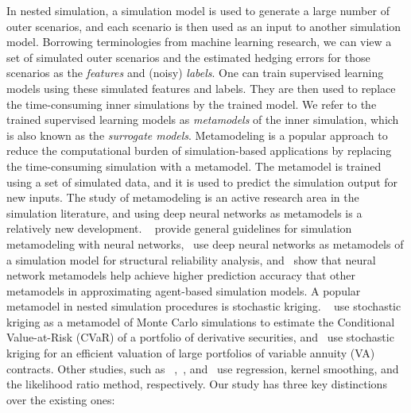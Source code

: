 \documentclass{article}
\begin{document}
In nested simulation, a simulation model is used to generate a large number of outer scenarios, and each scenario is then used as an input to another simulation model.
Borrowing terminologies from machine learning research, we can view a set of simulated outer scenarios and the estimated hedging errors for those scenarios as the \textit{features} and (noisy) \textit{labels}.
One can train supervised learning models using these simulated features and labels.
They are then used to replace the time-consuming inner simulations by the trained model.
We refer to the trained supervised learning models as \textit{metamodels} of the inner simulation, which is also known as the \textit{surrogate models}.
Metamodeling is a popular approach to reduce the computational burden of simulation-based applications by replacing the time-consuming simulation with a metamodel.
The metamodel is trained using a set of simulated data, and it is used to predict the simulation output for new inputs.
The study of metamodeling is an active research area in the simulation literature, and using deep neural networks as metamodels is a relatively new development.
~\cite{fonseca2003simulation} provide general guidelines for simulation metamodeling with neural networks,~\cite{lieu2022adaptive} use deep neural networks as metamodels of a simulation model for structural reliability analysis, and~\cite{salle2014efficient} show that neural network metamodels help achieve higher prediction accuracy that other metamodels in approximating agent-based simulation models.
A popular metamodel in nested simulation procedures is stochastic kriging.
~\cite{liu2010stochastic} use stochastic kriging as a metamodel of Monte Carlo simulations to estimate the Conditional Value-at-Risk (CVaR) of a portfolio of derivative securities, and~\cite{gan2015valuation} use stochastic kriging for an efficient valuation of large portfolios of variable annuity (VA) contracts.
Other studies, such as ~\cite{broadie2015risk},~\cite{hong2017kernel}, and~\cite{zhang2022sample} use regression, kernel smoothing, and the likelihood ratio method, respectively.
Our study has three key distinctions over the existing ones:
\end{document}
